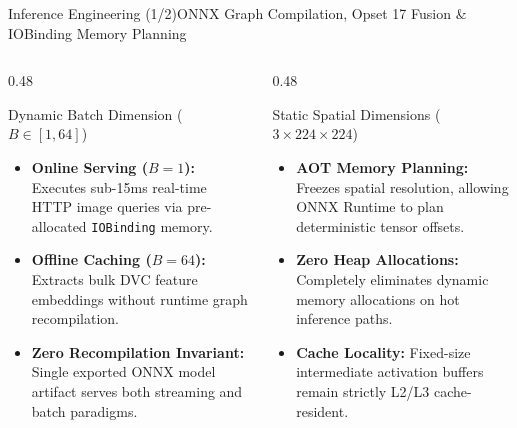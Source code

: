 \begin{frame}{Inference Engineering (1/2)}{ONNX Graph Compilation, Opset 17 Fusion \& IOBinding Memory Planning}
    \vspace{-0.15cm}
    \begin{columns}[T]
        \begin{column}{0.48\textwidth}
            \begin{block}{Dynamic Batch Dimension ($B \in [1, 64]$)}
                \begin{itemize}\scriptsize
                    \item \textbf{Online Serving ($B=1$):} Executes sub-15ms real-time HTTP image queries via pre-allocated \texttt{IOBinding} memory.
                    \item \textbf{Offline Caching ($B=64$):} Extracts bulk DVC feature embeddings without runtime graph recompilation.
                    \item \textbf{Zero Recompilation Invariant:} Single exported ONNX model artifact serves both streaming and batch paradigms.
                \end{itemize}
            \end{block}
        \end{column}
        \begin{column}{0.48\textwidth}
            \begin{block}{Static Spatial Dimensions ($3 \times 224 \times 224$)}
                \begin{itemize}\scriptsize
                    \item \textbf{AOT Memory Planning:} Freezes spatial resolution, allowing ONNX Runtime to plan deterministic tensor offsets.
                    \item \textbf{Zero Heap Allocations:} Completely eliminates dynamic memory allocations on hot inference paths.
                    \item \textbf{Cache Locality:} Fixed-size intermediate activation buffers remain strictly L2/L3 cache-resident.
                \end{itemize}
            \end{block}
        \end{column}
    \end{columns}

\end{frame}


